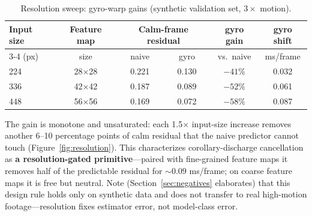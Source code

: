 \documentclass[12pt,a4paper]{article}
\begin{document}
\begin{table}[htbp]
  \centering
  \small
  \caption{Resolution sweep: gyro-warp gains (synthetic validation set, $3\times$ motion).}
  \label{tab:resolution}
  \begin{tabular}{lccccc}
    \toprule
    Input size & Feature map & \multicolumn{2}{c}{Calm-frame residual} & gyro gain & gyro shift \\
    \cmidrule(lr){3-4}
    (px) & size & naive & gyro & vs.\ naive & ms/frame \\
    \midrule
    224 & 28$\times$28 & 0.221 & 0.130 & $-41\%$ & 0.032 \\
    336 & 42$\times$42 & 0.187 & 0.089 & $-52\%$ & 0.061 \\
    448 & 56$\times$56 & 0.169 & 0.072 & $-58\%$ & 0.087 \\
    \bottomrule
  \end{tabular}
\end{table}

The gain is monotone and unsaturated: each 1.5$\times$ input-size increase removes another 6--10 percentage points of calm residual that the naive predictor cannot touch (Figure~\ref{fig:resolution}). This characterizes corollary-discharge cancellation as \textbf{a resolution-gated primitive}---paired with fine-grained feature maps it removes half of the predictable residual for ${\sim}0.09$ ms/frame; on coarse feature maps it is free but neutral. Note (Section~\ref{sec:negatives} elaborates) that this design rule holds only on synthetic data and does not transfer to real high-motion footage---resolution fixes estimator error, not model-class error.
\end{document}
